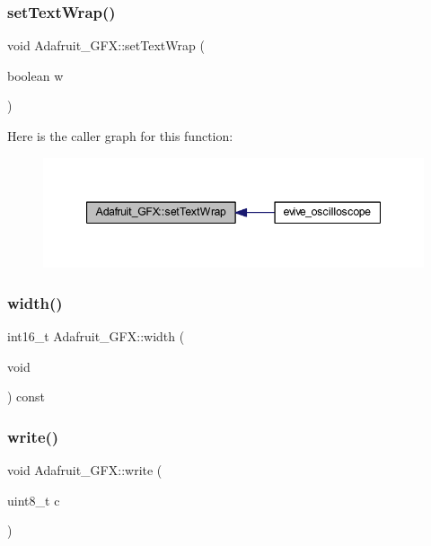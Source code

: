 \subsubsection{\texorpdfstring{set\+Text\+Wrap()}{setTextWrap()}}
{\footnotesize\ttfamily void Adafruit\+\_\+\+G\+F\+X\+::set\+Text\+Wrap (\begin{DoxyParamCaption}\item[{boolean}]{w }\end{DoxyParamCaption})}

Here is the caller graph for this function\+:\nopagebreak
\begin{figure}[H]
\begin{center}
\leavevmode
\includegraphics[width=347pt]{class_adafruit___g_f_x_aeeacd62bf26f3e7abbdc4b5b50faa6fa_icgraph}
\end{center}
\end{figure}
\mbox{\label{class_adafruit___g_f_x_a324b5361e7198ef0e79eaf4c80bddfc7}} 
\subsubsection{\texorpdfstring{width()}{width()}}
{\footnotesize\ttfamily int16\+\_\+t Adafruit\+\_\+\+G\+F\+X\+::width (\begin{DoxyParamCaption}\item[{void}]{ }\end{DoxyParamCaption}) const}

\mbox{\label{class_adafruit___g_f_x_af4978ea0cf0c0b0540567e82d8fa9900}} 
\subsubsection{\texorpdfstring{write()}{write()}}
{\footnotesize\ttfamily void Adafruit\+\_\+\+G\+F\+X\+::write (\begin{DoxyParamCaption}\item[{uint8\+\_\+t}]{c }\end{DoxyParamCaption})\hspace{0.3cm}{\ttfamily [virtual]}}

